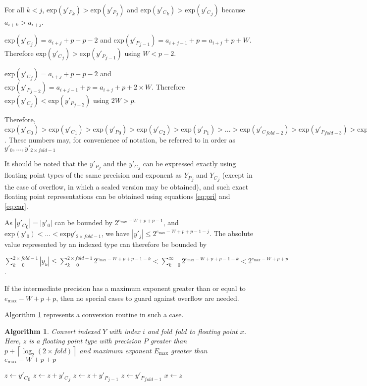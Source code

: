 \documentclass[12pt]{article}
\providecommand{\ceil}[1]{\left \lceil #1 \right \rceil }
\providecommand{\exp}{\ensuremath{\text{exp}}}
\providecommand{\max}{\ensuremath{\text{max}}}
\theoremstyle{plain}
\newtheorem{alg}{Algorithm}[section]
\begin{document}
    For all $k < j$, $\exp({y'_P}_k) > \exp({y'_P}_j)$ and $\exp({y'_C}_k) > \exp({y'_C}_j)$ because $a_{i + k} > a_{i + j}$.

    $\exp({y'_C}_j) = a_{i + j} + p + p - 2$ and $\exp({y'_P}_{j - 1}) = a_{i + j - 1} + p = a_{i + j} + p + W$. Therefore $\exp({y'_C}_j) > \exp({y'_P}_{j - 1})$ using $W < p - 2$.

    $\exp({y'_C}_j) = a_{i + j} + p + p - 2$ and $\exp({y'_P}_{j - 2}) = a_{i + j - 1} + p = a_{i + j} + p + 2\times W$. Therefore $\exp({y'_C}_j) < \exp({y'_P}_{j - 2})$ using $2W > p$.

    Therefore, $\exp({y'_C}_0) > \exp({y'_C}_1) > \exp({y'_P}_0) > \exp({y'_C}_2) > \exp({y'_P}_1) > ... > \exp({y'_C}_{fold - 2}) > \exp({y'_P}_{fold - 3}) > \exp({y'_C}_{fold - 1}) > \exp({y'_P}_{fold - 2}) > \exp({y'_P}_{fold - 1})$. These numbers may, for convenience of notation, be referred to in order as $y'_0, ..., y'_{2 \times fold - 1}$

    It should be noted that the ${y'_P}_j$ and the ${y'_C}_j$ can be expressed exactly using floating point types of the same precision and exponent as ${Y_P}_j$ and ${Y_C}_j$ (except in the case of overflow, in which a scaled version may be obtained), and such exact floating point representations can be obtained using equations \ref{eq:pri} and \ref{eq:car}.

    As $|{y'_C}_0| = |y'_0|$ can be bounded by $2^{e_{\max} - W + p + p - 1}$, and $\exp(y'_0) < ... < \exp{y'_{2 \times fold - 1}}$, we have $|y'_j| \leq 2^{e_{\max} - W + p + p - 1 - j}$. The absolute value represented by an indexed type can therefore be bounded by

    $\sum\limits_{k = 0}^{2 \times fold - 1} |y_k| \leq \sum\limits_{k = 0}^{2 \times fold - 1} 2^{e_{\max} - W + p + p - 1 - k} < \sum\limits_{k = 0}^{\infty} 2^{e_{\max} - W + p + p - 1 - k} < 2^{e_{\max} - W + p + p}$.

    If the intermediate precision has a maximum exponent greater than or equal to $e_{\max} - W + p + p$, then no special cases to guard against overflow are needed.

    Algorithm \ref{alg:conv2float} represents a conversion routine in such a case.

    \begin{alg}
      Convert indexed $Y$ with index $i$ and fold $fold$ to floating point $x$. Here, $z$ is a floating point type with precision $P$ greater than $p + \ceil{\log_2(2 \times fold)}$ and maximum exponent $E_{\max}$ greater than $e_{\max} - W + p + p$
      \begin{algorithmic}
          \State $z \gets {y'_C}_0$
            \State $z \gets z + {y'_C}_j$
            \State $z \gets z + {y'_P}_{j - 1}$
          \EndFor
          \State $z \gets {y'_P}_{fold - 1}$
          \State $x \gets z$
        \EndFunction
      \end{algorithmic}
      \label{alg:conv2float}
    \end{alg}
\end{document}
